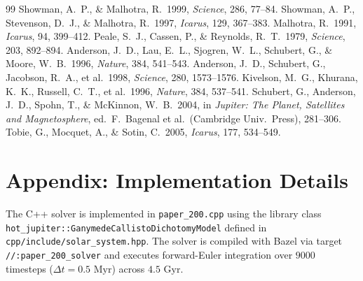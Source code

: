 \documentclass[11pt,a4paper]{article}
\begin{document}
\begin{thebibliography}{99}
 Showman, A.~P., \& Malhotra, R.\ 1999, \textit{Science}, 286, 77--84.
 Showman, A.~P., Stevenson, D.~J., \& Malhotra, R.\ 1997, \textit{Icarus}, 129, 367--383.
 Malhotra, R.\ 1991, \textit{Icarus}, 94, 399--412.
 Peale, S.~J., Cassen, P., \& Reynolds, R.~T.\ 1979, \textit{Science}, 203, 892--894.
 Anderson, J.~D., Lau, E.~L., Sjogren, W.~L., Schubert, G., \& Moore, W.~B.\ 1996, \textit{Nature}, 384, 541--543.
 Anderson, J.~D., Schubert, G., Jacobson, R.~A., et al.\ 1998, \textit{Science}, 280, 1573--1576.
 Kivelson, M.~G., Khurana, K.~K., Russell, C.~T., et al.\ 1996, \textit{Nature}, 384, 537--541.
 Schubert, G., Anderson, J.~D., Spohn, T., \& McKinnon, W.~B.\ 2004, in \textit{Jupiter: The Planet, Satellites and Magnetosphere}, ed.\ F.~Bagenal et al.\ (Cambridge Univ.\ Press), 281--306.
 Tobie, G., Mocquet, A., \& Sotin, C.\ 2005, \textit{Icarus}, 177, 534--549.
\end{thebibliography}

\section*{Appendix: Implementation Details}
The C++ solver is implemented in \texttt{paper\_200.cpp} using the library class \linebreak
\texttt{hot\_jupiter::GanymedeCallistoDichotomyModel} defined in \texttt{cpp/include/solar\_system.hpp}. The solver is compiled with Bazel via target \texttt{//:paper\_200\_solver} and executes forward-Euler integration over $9000$ timesteps ($\Delta t = 0.5\text{ Myr}$) across $4.5\text{ Gyr}$.
\end{document}
